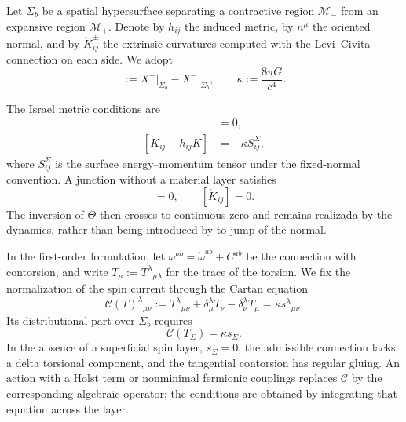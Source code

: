 Let \(\Sigma_b\) be a spatial hypersurface separating a contractive region \(\mathcal M_-\) from an expansive region \(\mathcal M_+\). Denote by \(h_{ij}\) the induced metric, by \(n^\mu\) the oriented normal, and by \(\mathring K_{ij}^\pm\) the extrinsic curvatures computed with the Levi--Civita connection on each side. We adopt
\begin{equation}
 [X]:=X^+\big|_{\Sigma_b}-X^-\big|_{\Sigma_b},
 \qquad
 \kappa:=\frac{8\pi G}{c^4}.
 \label{eq:descendant-jump-kappa}
\end{equation}

The Israel metric conditions are
\begin{align}
 [h_{ij}]&=0,
 \label{eq:descendant-Israel-first}\\
 [\mathring K_{ij}-h_{ij}\mathring K]
 &=-\kappa S^{\Sigma}_{ij},
 \label{eq:descendant-Israel-second}
\end{align}
where \(S^\Sigma_{ij}\) is the surface energy--momentum tensor under the fixed-normal
convention. A junction without a material layer satisfies
\begin{equation}
 [h_{ij}]=0,
 \qquad
 [\mathring K_{ij}]=0.
 \label{eq:descendant-shell-free-Israel}
\end{equation}
The inversion of \(\Theta\) then crosses to continuous zero and remains
realizada by the dynamics, rather than being introduced by to jump of the
normal.

In the first-order formulation, let
\(\omega^{ab}=\mathring\omega^{ab}+C^{ab}\) be the connection with contorsion,
and write \(T_\mu:=T^\lambda{}_{\mu\lambda}\) for the trace of the
torsion.
We fix the normalization of the spin current through the Cartan equation
\begin{equation}
 \mathscr C(T)^{\lambda}{}_{\mu\nu}
 :=T^{\lambda}{}_{\mu\nu}
 +\delta^\lambda_\mu T_\nu
 -\delta^\lambda_\nu T_\mu
 =\kappa s^{\lambda}{}_{\mu\nu}.
 \label{eq:descendant-Cartan-equation}
\end{equation}
Its distributional part over \(\Sigma_b\) requires
\begin{equation}
 \boxed{
 \mathscr C(T_\Sigma)
 =\kappa s_\Sigma.}
 \label{eq:descendant-Cartan-junction}
\end{equation}
In the absence of a superficial spin layer,
\(s_\Sigma=0\), the admissible connection lacks a delta torsional component,
and the tangential contorsion has regular gluing. An action with a
Holst term or nonminimal fermionic couplings replaces
\(\mathscr C\) by the corresponding algebraic operator; the conditions
are obtained by integrating that equation across the layer.

